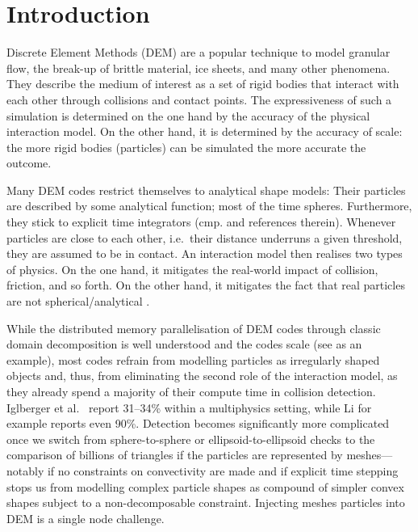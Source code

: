 \section{Introduction}
%
%
Discrete Element Methods (DEM) are a popular technique to model granular flow,
the break-up of brittle material, ice sheets, and many other phenomena.
They describe the medium of interest as a set of rigid bodies that interact with
each other through collisions and contact points.
The expressiveness of such a simulation is determined on the one hand by the
accuracy of the physical interaction model.
On the other hand, it is determined by the accuracy of scale: the more
rigid bodies (particles) can be simulated the more accurate the outcome.


%
%

Many DEM codes restrict themselves to analytical shape models:
Their particles are described by some analytical function; most of the time spheres.
Furthermore, they stick to explicit time integrators (cmp. \cite{Boac2014} and
references therein).
Whenever particles are close to each other, i.e.~their distance underruns a
given threshold, they are assumed to be in contact. An interaction model then
realises two types of physics.
On the one hand, it mitigates the real-world impact of collision,
friction, and so forth.
On the other hand, it mitigates the fact that real particles are not
spherical/analytical \cite{Johnson2015}.


%
%
While the distributed memory parallelisation of DEM codes through classic
domain decomposition is well understood and the codes scale
(see \cite{Iglberger2010} as an example), most codes refrain from modelling
particles as irregularly shaped objects and, thus, from eliminating the second role of the interaction model, as
they already spend a majority of their compute time in collision detection.
Iglberger et al.~\cite{Iglberger2010} report 31--34\% within a multiphysics
setting, while Li \cite{Li1998} for example reports even 90\%.
Detection becomes significantly more complicated once we switch from
sphere-to-sphere or ellipsoid-to-ellipsoid checks to the comparison of billions
of triangles if the particles are represented by meshes---notably if no
constraints on convectivity are made and if explicit time stepping stops us
from modelling complex particle shapes as compound of simpler convex shapes
subject to a non-decomposable constraint.
Injecting meshes particles into DEM is a single node challenge.


